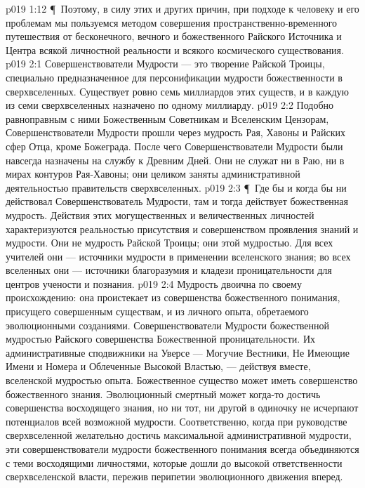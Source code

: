 \vs p019 1:12 \P\ Поэтому, в силу этих и других причин, при подходе к человеку и его проблемам мы пользуемся методом совершения пространственно\hyp{}временного путешествия от бесконечного, вечного и божественного Райского Источника и Центра всякой личностной реальности и всякого космического существования.
\vs p019 2:1 Совершенствователи Мудрости --- это творение Райской Троицы, специально предназначенное для персонификации мудрости божественности в сверхвселенных. Существует ровно семь миллиардов этих существ, и в каждую из семи сверхвселенных назначено по одному миллиарду.
\vs p019 2:2 Подобно равноправным с ними Божественным Советникам и Вселенским Цензорам, Совершенствователи Мудрости прошли через мудрость Рая, Хавоны и Райских сфер Отца, кроме Божеграда. После чего Совершенствователи Мудрости были навсегда назначены на службу к Древним Дней. Они не служат ни в Раю, ни в мирах контуров Рая\hyp{}Хавоны; они целиком заняты административной деятельностью правительств сверхвселенных.
\vs p019 2:3 \P\ Где бы и когда бы ни действовал Совершенствователь Мудрости, там и тогда действует божественная мудрость. Действия этих могущественных и величественных личностей характеризуются реальностью присутствия и совершенством проявления знаний и мудрости. Они не  мудрость Райской Троицы; они  этой мудростью. Для всех учителей они --- источники мудрости в применении вселенского знания; во всех вселенных они --- источники благоразумия и кладези проницательности для центров учености и познания.
\vs p019 2:4 Мудрость двоична по своему происхождению: она проистекает из совершенства божественного понимания, присущего совершенным существам, и из личного опыта, обретаемого эволюционными созданиями. Совершенствователи Мудрости  божественной мудростью Райского совершенства Божественной проницательности. Их административные сподвижники на Уверсе --- Могучие Вестники, Не Имеющие Имени и Номера и Облеченные Высокой Властью, --- действуя вместе,  вселенской мудростью опыта. Божественное существо может иметь совершенство божественного знания. Эволюционный смертный может когда\hyp{}то достичь совершенства восходящего знания, но ни тот, ни другой в одиночку не исчерпают потенциалов всей возможной мудрости. Соответственно, когда при руководстве сверхвселенной желательно достичь максимальной административной мудрости, эти совершенствователи мудрости божественного понимания всегда объединяются с теми восходящими личностями, которые дошли до высокой ответственности сверхвселенской власти, пережив перипетии эволюционного движения вперед.
